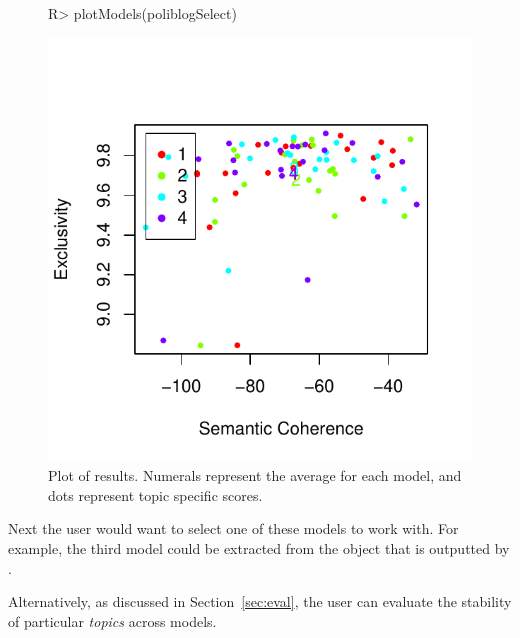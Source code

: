 \documentclass[article,shortnames]{jss}
\begin{document}
\begin{figure}
\begin{center}
\begin{Schunk}
\begin{Sinput}
R> plotModels(poliblogSelect)
\end{Sinput}
\end{Schunk}
\includegraphics{stmVignette-008}
\caption{Plot of  results. Numerals represent the average for each model, and dots represent topic specific scores.}
\label{fig:select}
\end{center}
\end{figure}

Next the user would want to select one of these models to work with. For example, the third model could be extracted from the object that is outputted by .

\begin{Schunk}
\end{Schunk}

Alternatively, as discussed in Section~\ref{sec:eval}, the user can evaluate the stability of particular \emph{topics} across models.  
\end{document}
